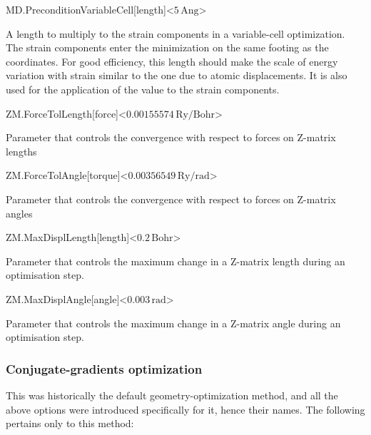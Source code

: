 \begin{fdfentry}{MD.PreconditionVariableCell}[length]<$5\,\mathrm{Ang}$>
  
  A length to multiply to the strain components in a variable-cell
  optimization. The strain components enter the minimization on the
  same footing as the coordinates. For good efficiency, this length
  should make the scale of energy variation with strain similar to the
  one due to atomic displacements. It is also used for the application
  of the  value to the strain components.

\end{fdfentry}


\begin{fdfentry}{ZM.ForceTolLength}[force]<$0.00155574\,\mathrm{Ry/Bohr}$>
  
  Parameter that controls the convergence with respect to forces on
  Z-matrix lengths

\end{fdfentry}


\begin{fdfentry}{ZM.ForceTolAngle}[torque]<$0.00356549\,\mathrm{Ry/rad}$>
  
  Parameter that controls the convergence with respect to forces on
  Z-matrix angles

\end{fdfentry}

\begin{fdfentry}{ZM.MaxDisplLength}[length]<$0.2\,\mathrm{Bohr}$>
  
  Parameter that controls the maximum change in a Z-matrix length
  during an optimisation step.

\end{fdfentry}

\begin{fdfentry}{ZM.MaxDisplAngle}[angle]<$0.003\,\mathrm{rad}$>
  
  Parameter that controls the maximum change in a Z-matrix angle
  during an optimisation step.

\end{fdfentry}



\subsubsection{Conjugate-gradients optimization}

This was historically the default geometry-optimization method, and
all the above options were introduced specifically for it, hence their
names. The following pertains only to this method:

